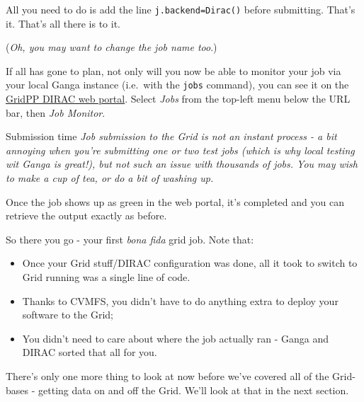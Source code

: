 All you need to do is add the line \texttt{j.backend=Dirac()} before
submitting. That's it. That's all there is to it.

\begin{Shaded}
\begin{Highlighting}[]
\NormalTok{$ } 
 
 \NormalTok{= }
 
 \NormalTok{)}
 \NormalTok{= [}\NormalTok{]}
 \NormalTok{= [ LocalFile(}\NormalTok{) ]}
 \NormalTok{= [ LocalFile(}\NormalTok{), }\NormalTok{(}\NormalTok{), }
\NormalTok{(}\NormalTok{) ]}
 
\NormalTok{()}
\end{Highlighting}
\end{Shaded}

(\emph{Oh, you may want to change the job name too}.)

If all has gone to plan, not only will you now be able to monitor your
job via your local Ganga instance (i.e.~with the \texttt{jobs} command),
you can see it on the \href{http://dirac.gridpp.ac.uk}{GridPP DIRAC web
portal}. Select \emph{Jobs} from the top-left menu below the URL bar,
then \emph{Job Monitor}.

\begin{warningbox}{Submission time}
\emph{Job submission to the Grid is not an instant process - a bit annoying
when you're submitting one or two test jobs (which is why local testing
wit Ganga is great!), but not such an issue with thousands of jobs. You
may wish to make a cup of tea, or do a bit of washing up.}
\end{warningbox}

Once the job shows up as green in the web portal, it's completed and you
can retrieve the output exactly as before.

So there you go - your first \emph{bona fida} grid job. Note that:

\begin{itemize}
\tightlist
\item Once your Grid stuff/DIRAC configuration was done, all it took to switch
to Grid running was a single line of code.
\item Thanks to CVMFS, you didn't have to do anything extra to deploy
your software to the Grid;
\item You didn't need to care about where the job actually ran - Ganga and DIRAC
sorted that all for you.
\end{itemize}

There's only one more thing to look at now before we've covered all of
the Grid-bases - getting data on and off the Grid. We'll look at that in
the next section.

\newpage




